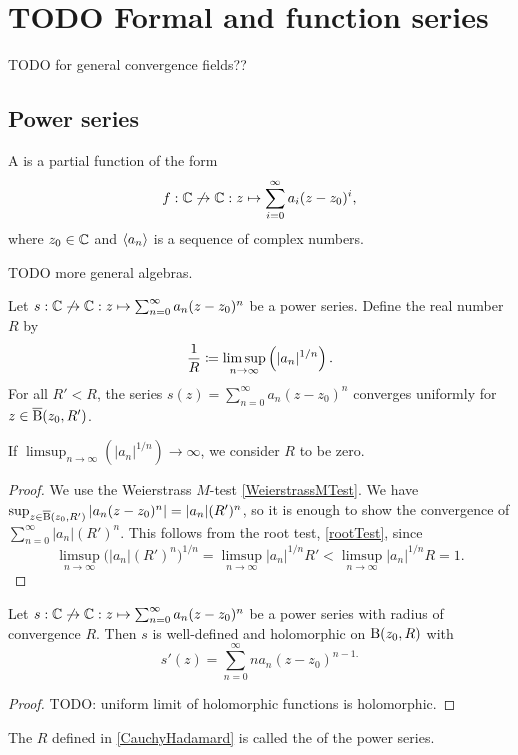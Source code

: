 \chapter{TODO Formal and function series}
TODO for general convergence fields??
\section{Power series}
\begin{definition}
A  is a partial function of the form
\[ f: \mathbb{C}\not\to \mathbb{C}: z\mapsto \sum_{i=0}^\infty a_i(z-z_0)^i, \]
where $z_0\in \mathbb{C}$ and $\left\langle a_n \right\rangle$ is a sequence of complex numbers. 
\end{definition}
TODO more general algebras.

\begin{proposition} \label{CauchyHadamard}
Let $s: \mathbb{C}\not\to \mathbb{C}: z\mapsto \sum_{n=0}^\infty a_n(z-z_0)^n$ be a power series. Define the real number $R$ by
\[ \frac{1}{R} \coloneqq \limsup_{n\to\infty}\left(|a_n|^{1/n}\right). \]
For all $R'< R$, the series $s(z) = \sum_{n=0}^\infty a_n(z-z_0)^n$ converges uniformly for $z\in \operatorname{\overline{B}}(z_0, R')$.
\end{proposition}
If $\limsup_{n\to\infty}\left(|a_n|^{1/n}\right) \to \infty$, we consider $R$ to be zero.
\begin{proof}
We use the Weierstrass $M$-test \ref{WeierstrassMTest}.
We have $\sup_{z\in \operatorname{\overline{B}}(z_0, R')}|a_n(z-z_0)^n| = |a_n|(R')^n$, so it is enough to show the convergence of $\sum_{n=0}^\infty |a_n|(R')^n$. This follows from the root test, \ref{rootTest}, since 
\[ \limsup_{n\to \infty}\big(|a_n|(R')^n\big)^{1/n}= \limsup_{n\to \infty}|a_n|^{1/n}R' < \limsup_{n\to \infty}|a_n|^{1/n}R = 1. \]
\end{proof}
\begin{corollary} \label{powerSeriesHolomorphic}
Let $s: \mathbb{C}\not\to \mathbb{C}: z\mapsto \sum_{n=0}^\infty a_n(z-z_0)^n$ be a power series with radius of convergence $R$. Then $s$ is well-defined and holomorphic on $\operatorname{B}(z_0,R)$ with
\[ s'(z) = \sum_{n=0}^\infty na_n(z-z_0)^{n-1.} \]
\end{corollary}
\begin{proof}
TODO: uniform limit of holomorphic functions is holomorphic.
\end{proof}

\begin{definition}
The $R$ defined in \ref{CauchyHadamard} is called the  of the power series.
\end{definition}

